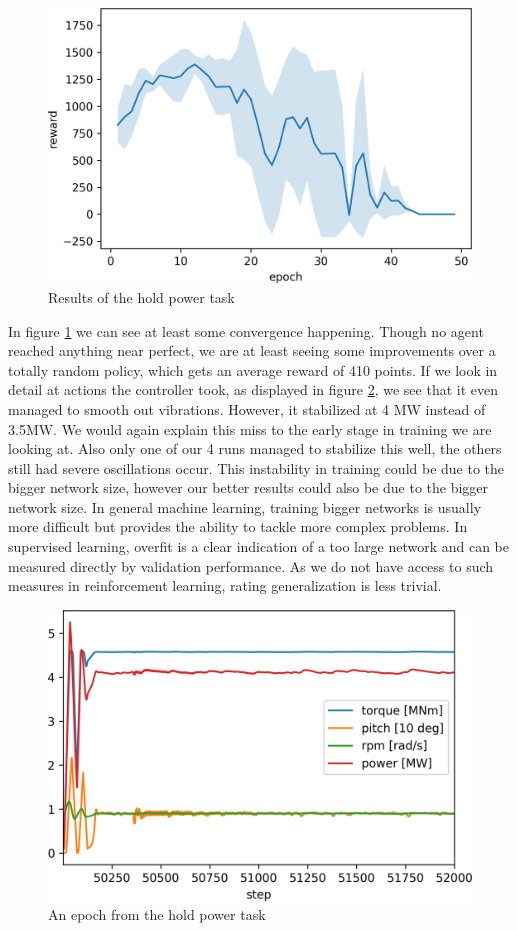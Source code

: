 \documentclass[hyperref,final,beleg]{cgvpub}
\begin{document}
\begin{figure}
  \centering
  \includegraphics[width=0.5\linewidth]{images/hold_power.png}
  \caption{Results of the hold power task}
  \label{fig:holdpower}
\end{figure}

In figure \ref{fig:holdpower} we can see at least some convergence happening. Though no agent reached anything near perfect, we are at least seeing some improvements over a totally random policy, which gets an average reward of 410 points. If we look in detail at actions the controller took, as displayed in figure \ref{fig:holdpowerepoch}, we see that it even managed to smooth out vibrations. However, it stabilized at 4 MW instead of 3.5MW. We would again explain this miss to the early stage in training we are looking at. Also only one of our 4 runs managed to stabilize this well, the others still had severe oscillations occur. This instability in training could be due to the bigger network size, however our better results could also be due to the bigger network size. In general machine learning, training bigger networks is usually more difficult but provides the ability to tackle more complex problems. In supervised learning, overfit is a clear indication of a too large network and can be measured directly by validation performance. As we do not have access to such measures in reinforcement learning, rating generalization is less trivial.

\begin{figure}
  \centering
  \includegraphics[width=0.5\linewidth]{images/hold_power_epoch.png}
  \caption{An epoch from the hold power task}
  \label{fig:holdpowerepoch}
\end{figure}
\end{document}
